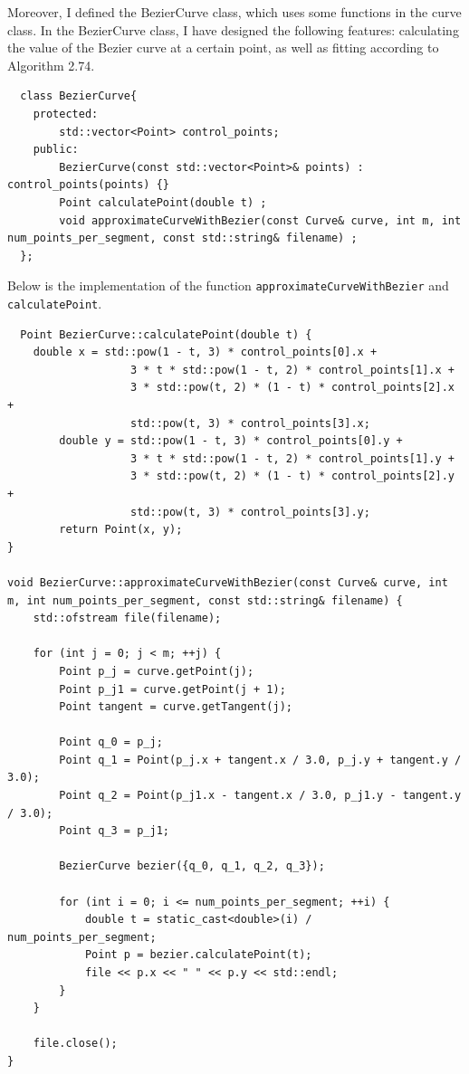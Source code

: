 \documentclass[a4paper]{article}
\begin{document}
Moreover, I defined the BezierCurve class, which uses some functions in the curve class.
In the BezierCurve class, I have designed the following features: calculating the value of the Bezier curve at a certain point, as well as fitting according to Algorithm 2.74.
\begin{lstlisting}
  class BezierCurve{
    protected:
        std::vector<Point> control_points;
    public:
        BezierCurve(const std::vector<Point>& points) : control_points(points) {}
        Point calculatePoint(double t) ;
        void approximateCurveWithBezier(const Curve& curve, int m, int num_points_per_segment, const std::string& filename) ;
  };
\end{lstlisting}
Below is the implementation of the function \texttt{approximateCurveWithBezier} and \texttt{calculatePoint}.
\begin{lstlisting}
  Point BezierCurve::calculatePoint(double t) {
    double x = std::pow(1 - t, 3) * control_points[0].x +
                   3 * t * std::pow(1 - t, 2) * control_points[1].x +
                   3 * std::pow(t, 2) * (1 - t) * control_points[2].x +
                   std::pow(t, 3) * control_points[3].x;
        double y = std::pow(1 - t, 3) * control_points[0].y +
                   3 * t * std::pow(1 - t, 2) * control_points[1].y +
                   3 * std::pow(t, 2) * (1 - t) * control_points[2].y +
                   std::pow(t, 3) * control_points[3].y;
        return Point(x, y);
}

void BezierCurve::approximateCurveWithBezier(const Curve& curve, int m, int num_points_per_segment, const std::string& filename) {
    std::ofstream file(filename);

    for (int j = 0; j < m; ++j) {
        Point p_j = curve.getPoint(j);
        Point p_j1 = curve.getPoint(j + 1);
        Point tangent = curve.getTangent(j);

        Point q_0 = p_j;
        Point q_1 = Point(p_j.x + tangent.x / 3.0, p_j.y + tangent.y / 3.0);
        Point q_2 = Point(p_j1.x - tangent.x / 3.0, p_j1.y - tangent.y / 3.0);
        Point q_3 = p_j1;

        BezierCurve bezier({q_0, q_1, q_2, q_3});

        for (int i = 0; i <= num_points_per_segment; ++i) {
            double t = static_cast<double>(i) / num_points_per_segment;
            Point p = bezier.calculatePoint(t);
            file << p.x << " " << p.y << std::endl;
        }
    }
    
    file.close();
}
\end{lstlisting}
\end{document}
